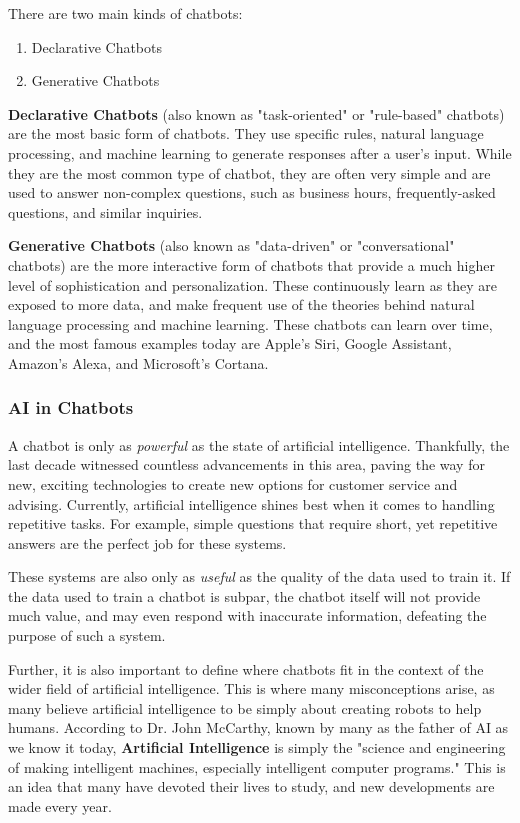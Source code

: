 \documentclass[titlepage, 12pt]{article}
\begin{document}
There are two main kinds of chatbots:

\begin{enumerate}
    \item Declarative Chatbots
    \item Generative Chatbots
\end{enumerate}

\textbf{Declarative Chatbots} (also known as "task-oriented" or "rule-based" chatbots) are the most basic form of chatbots. They use specific rules, natural language processing, and machine learning to generate responses after a user's input. While they are the most common type of chatbot, they are often very simple and are used to answer non-complex questions, such as business hours, frequently-asked questions, and similar inquiries.

\textbf{Generative Chatbots} (also known as "data-driven" or "conversational" chatbots) are the more interactive form of chatbots that provide a much higher level of sophistication and personalization. These continuously learn as they are exposed to more data, and make frequent use of the theories behind natural language processing and machine learning. These chatbots can learn over time, and the most famous examples today are Apple's Siri, Google Assistant, Amazon's Alexa, and Microsoft's Cortana.

\subsubsection{AI in Chatbots}

A chatbot is only as \emph{powerful} as the state of artificial intelligence. Thankfully, the last decade witnessed countless advancements in this area, paving the way for new, exciting technologies to create new options for customer service and advising. Currently, artificial intelligence shines best when it comes to handling repetitive tasks. For example, simple questions that require short, yet repetitive answers are the perfect job for these systems.

These systems are also only as \emph{useful} as the quality of the data used to train it. If the data used to train a chatbot is subpar, the chatbot itself will not provide much value, and may even respond with inaccurate information, defeating the purpose of such a system.

Further, it is also important to define where chatbots fit in the context of the wider field of artificial intelligence. This is where many misconceptions arise, as many believe artificial intelligence to be simply about creating robots to help humans. According to Dr. John McCarthy, known by many as the father of AI as we know it today, \textbf{Artificial Intelligence} is simply the "science and engineering of making intelligent machines, especially intelligent computer programs." This is an idea that many have devoted their lives to study, and new developments are made every year.
\end{document}
